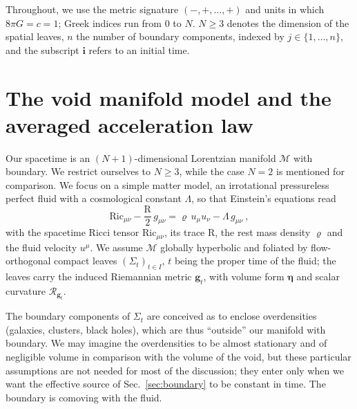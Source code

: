 \documentclass[aps,prd,reprint,amsmath,amssymb,nofootinbib,longbibliography]{revtex4-2}
\newcommand{\g}{\mathbf{g}}                 %
\newcommand{\Rs}{\mathcal{R}}               %
\newcommand{\vol}{\boldsymbol{\eta}}        %
\newcommand{\M}{\mathcal{M}}                %
\theoremstyle{plain}
\theoremstyle{definition}
\theoremstyle{remark}
\begin{document}
Throughout, we use the metric signature $(-,+,\dots,+)$ and units in which $8\pi G = c = 1$; Greek indices run from $0$ to $N$. $N\ge 3$ denotes the dimension of the spatial leaves, $n$ the number of boundary components, indexed by $j\in\{1,\dots,n\}$, and the subscript $\mathbf{i}$ refers to an initial time.

\section{The void manifold model and the averaged acceleration law}
\label{sec:model}

Our spacetime is an $(N+1)$-dimensional Lorentzian manifold $\M$ with boundary. We restrict ourselves to $N\geq 3$, while the case $N=2$ is mentioned for comparison. We focus on a simple matter model, an irrotational pressureless perfect fluid with a cosmological constant $\Lambda$, so that Einstein's equations read
\begin{equation}
\label{eq:einstein}
\mathrm{Ric}_{\mu\nu}-\frac{\mathrm{R}}{2}\,g_{\mu\nu}=\varrho \, u_\mu u_\nu -\Lambda\, g_{\mu\nu} \ ,
\end{equation}
with the spacetime Ricci tensor $\mathrm{Ric}_{\mu\nu}$, its trace $\mathrm{R}$, the rest mass density $\varrho$ and the fluid velocity $u^\mu$. We assume $\M$ globally hyperbolic and foliated by flow-orthogonal compact leaves $(\Sigma_t)_{t\in I}$, $t$ being the proper time of the fluid; the leaves carry the induced Riemannian metric $\g_t$, with volume form $\vol$ and scalar curvature $\Rs_{\g_t}$.

The boundary components of $\Sigma_t$ are conceived as to enclose overdensities (galaxies, clusters, black holes), which are thus ``outside'' our manifold with boundary. We may imagine the overdensities to be almost stationary and of negligible volume in comparison with the volume of the void, but these particular assumptions are not needed for most of the discussion; they enter only when we want the effective source of Sec.~\ref{sec:boundary} to be constant in time. The boundary is comoving with the fluid.
\end{document}
